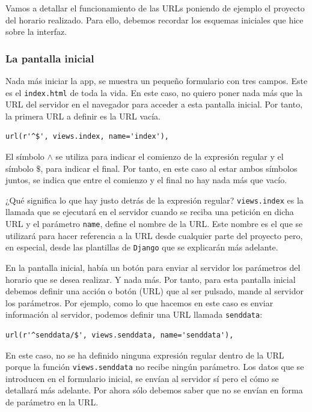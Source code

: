 Vamos a detallar el funcionamiento de las URLs poniendo de ejemplo el proyecto del horario realizado. Para ello, debemos recordar los esquemas iniciales que hice sobre la interfaz. 

\subsubsection{La pantalla inicial}
Nada más iniciar la app, se muestra un pequeño formulario con tres campos. Este es el \texttt{index.html} de toda la vida. En este caso, no quiero poner nada más que la URL del servidor en el navegador para acceder a esta pantalla inicial. Por tanto, la primera URL a definir es la URL vacía.

\begin{verbatim}
url(r'^$', views.index, name='index'),
\end{verbatim}

El símbolo $\land$ se utiliza para indicar el comienzo de la expresión regular y el símbolo $\$$, para indicar el final. Por tanto, en este caso al estar ambos símbolos juntos, se indica que entre el comienzo y el final no hay nada más que vacío.

¿Qué significa lo que hay justo detrás de la expresión regular? \texttt{views.index} es la llamada que se ejecutará en el servidor cuando se reciba una petición en dicha URL y el parámetro \texttt{name}, define el nombre de la URL. Este nombre es el que se utilizará para hacer referencia a la URL desde cualquier parte del proyecto pero, en especial, desde las plantillas de \texttt{Django} que se explicarán más adelante.

En la pantalla inicial, había un botón para enviar al servidor los parámetros del horario que se desea realizar. Y nada más. Por tanto, para esta pantalla inicial debemos definir una acción o botón (URL) que al ser pulsado, mande al servidor los parámetros. Por ejemplo, como lo que hacemos en este caso es enviar información al servidor, podemos definir una URL llamada \texttt{senddata}:

\begin{verbatim}
url(r'^senddata/$', views.senddata, name='senddata'),
\end{verbatim}

En este caso, no se ha definido ninguna expresión regular dentro de la URL porque la función \texttt{views.senddata} no recibe ningún parámetro. Los datos que se introducen en el formulario inicial, se envían al servidor sí pero el cómo se detallará más adelante. Por ahora sólo debemos saber que no se envían en forma de parámetro en la URL.

